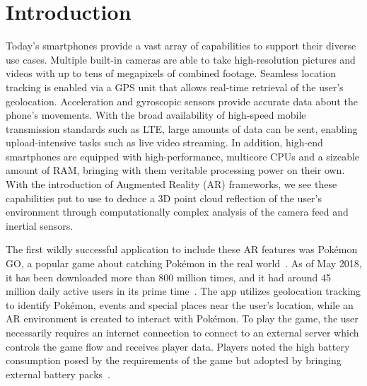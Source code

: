 \section{Introduction}
Today's smartphones provide a vast array of capabilities to support their diverse use cases.
Multiple built-in cameras are able to take high-resolution pictures and videos with up to tens of megapixels of combined footage. 
Seamless location tracking is enabled via a GPS unit that allows real-time retrieval of the user's geolocation.
Acceleration and gyroscopic sensors provide accurate data about the phone's movements.
With the broad availability of high-speed mobile transmission standards such as LTE, large amounts of data can be sent, enabling upload-intensive tasks such as live video streaming.
In addition, high-end smartphones are equipped with high-performance, multicore CPUs and a sizeable amount of RAM, bringing with them veritable processing power on their own.
With the introduction of Augmented Reality (AR) frameworks, we see these capabilities put to use to deduce a 3D point cloud reflection of the user's environment through computationally complex analysis of the camera feed and inertial sensors.

The first wildly successful application to include these AR features was Pokémon GO, a popular game about catching Pokémon in the real world~\cite{pkmgo}.
As of May 2018, it has been downloaded more than 800 million times, and it had around 45 million daily active users in its prime time~\cite{PkmDownloads}.
The app utilizes geolocation tracking to identify Pokémon, events and special places near the user's location, while an AR environment is created to interact with Pokémon.
To play the game, the user necessarily requires an internet connection to connect to an external server which controls the game flow and receives player data.
Players noted the high battery consumption posed by the requirements of the game but adopted by bringing external battery packs~\cite{PkmBattery}.

